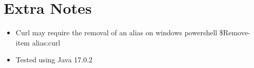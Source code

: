 \documentclass[11pt, letterpaper]{report}
\begin{document}
\section{Extra Notes}
\begin{itemize}
    \item Curl may require the removal of an alias on windows powershell \$Remove-item alias:curl

    \item Tested using Java 17.0.2
\end{itemize}
\end{document}
